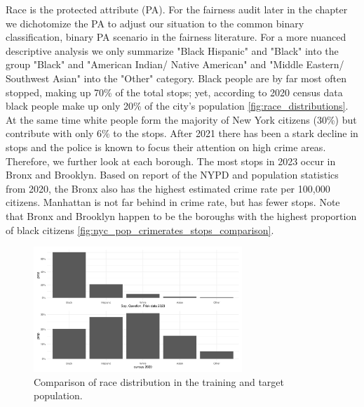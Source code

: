 Race is the protected attribute (PA). For the fairness audit later in the chapter we dichotomize the PA to adjust our situation to the common binary classification, binary PA scenario in the fairness literature. For a more nuanced descriptive analysis we only summarize "Black Hispanic" and "Black" into the group "Black" and  "American Indian/ Native American" and "Middle Eastern/ Southwest Asian" into the "Other" category.  
Black people are by far most often stopped, making up 70\% of the total stops; yet, according to 2020 census data black people make up only 20\% of the city's population \autoref{fig:race_distributions}. At the same time white people form the majority of New York citizens (30\%) but contribute with only 6\% to the stops. 
After 2021 there has been a stark decline in stops and the police is known to focus their attention on high crime areas. Therefore, we further look at each borough. 
The most stops in 2023 occur in Bronx and Brooklyn. Based on report of the NYPD and population statistics from 2020, the Bronx also has the highest estimated crime rate per 100,000 citizens. Manhattan is not far behind in crime rate, but has fewer stops. Note that Bronx and Brooklyn happen to be the boroughs with the highest proportion of black citizens \autoref{fig:nyc_pop_crimerates_stops_comparison}. 
\begin{figure}
  \centering
  \includegraphics[width=0.7\textwidth]{../figures/sqf_case_study_plot6.png}
  \caption{Comparison of race distribution in the training and target population.}
  \label{fig:race_distributions}
\end{figure}

